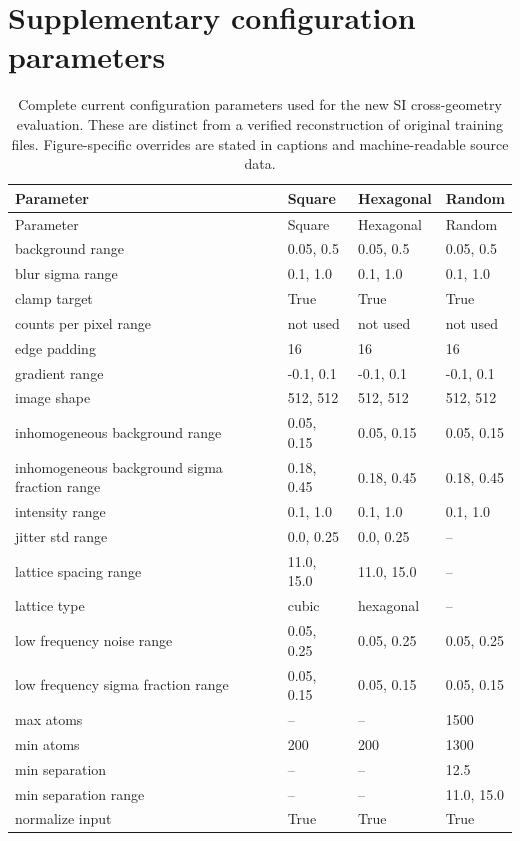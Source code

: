 \clearpage
\section{Supplementary configuration parameters}
\small
\begin{longtable}{p{2.0in}p{1.15in}p{1.15in}p{1.15in}}
\caption{Complete current configuration parameters used for the new SI cross-geometry evaluation. These are distinct from a verified reconstruction of original training files. Figure-specific overrides are stated in captions and machine-readable source data.}\\
\hline Parameter & Square & Hexagonal & Random\\\hline\endfirsthead
\hline Parameter & Square & Hexagonal & Random\\\hline\endhead
background range & 0.05, 0.5 & 0.05, 0.5 & 0.05, 0.5\\
blur sigma range & 0.1, 1.0 & 0.1, 1.0 & 0.1, 1.0\\
clamp target & True & True & True\\
counts per pixel range & not used & not used & not used\\
edge padding & 16 & 16 & 16\\
gradient range & -0.1, 0.1 & -0.1, 0.1 & -0.1, 0.1\\
image shape & 512, 512 & 512, 512 & 512, 512\\
inhomogeneous background range & 0.05, 0.15 & 0.05, 0.15 & 0.05, 0.15\\
inhomogeneous background sigma fraction range & 0.18, 0.45 & 0.18, 0.45 & 0.18, 0.45\\
intensity range & 0.1, 1.0 & 0.1, 1.0 & 0.1, 1.0\\
jitter std range & 0.0, 0.25 & 0.0, 0.25 & --\\
lattice spacing range & 11.0, 15.0 & 11.0, 15.0 & --\\
lattice type & cubic & hexagonal & --\\
low frequency noise range & 0.05, 0.25 & 0.05, 0.25 & 0.05, 0.25\\
low frequency sigma fraction range & 0.05, 0.15 & 0.05, 0.15 & 0.05, 0.15\\
max atoms & -- & -- & 1500\\
min atoms & 200 & 200 & 1300\\
min separation & -- & -- & 12.5\\
min separation range & -- & -- & 11.0, 15.0\\
normalize input & True & True & True\\

\end{longtable}
